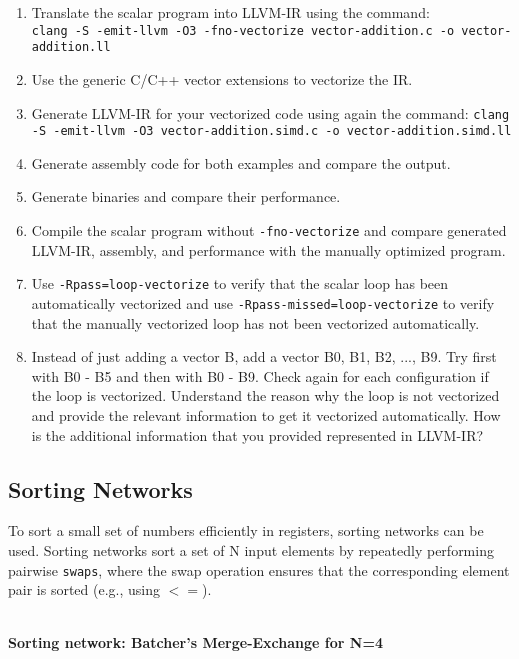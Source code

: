 \documentclass[12pt]{article}
\begin{document}
\begin{enumerate}
	\item Translate the scalar program into LLVM-IR using the command:\\
	      \texttt{clang -S -emit-llvm -O3 -fno-vectorize vector-addition.c -o vector-addition.ll}
	\item Use the generic C/C++ vector extensions to vectorize the IR.
	\item Generate LLVM-IR for your vectorized code using again the command:
	      \texttt{clang -S -emit-llvm -O3 vector-addition.simd.c -o vector-addition.simd.ll }
	\item Generate assembly code for both examples and compare the output.
	\item Generate binaries and compare their performance.
	\item Compile the scalar program without \texttt{-fno-vectorize} and
              compare generated LLVM-IR, assembly, and performance with the
              manually optimized program.
	\item Use \texttt{-Rpass=loop-vectorize} to verify that the scalar loop
	      has been automatically vectorized and use
              \texttt{-Rpass-missed=loop-vectorize} to verify that the manually
              vectorized loop has not been vectorized automatically.
	\item Instead of just adding a vector B, add a vector B0, B1, B2, ...,
	      B9. Try first with B0 - B5 and then with B0 - B9. Check again for
	      each configuration if the loop is vectorized. Understand the
	      reason why the loop is not vectorized and provide the relevant
	      information to get it vectorized automatically. How is the
	      additional information that you provided represented in LLVM-IR?
\end{enumerate}

\subsection{Sorting Networks}

To sort a small set of numbers efficiently in registers, sorting networks can
be used. Sorting networks sort a set of N input elements by repeatedly
performing pairwise \texttt{swaps}, where the swap operation ensures that the
corresponding element pair is sorted (e.g., using $<=$).

~\\
\textbf{Sorting network: Batcher's Merge-Exchange for N=4}\\
\end{document}
